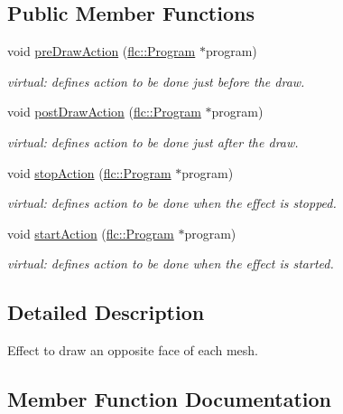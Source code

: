 \subsection*{Public Member Functions}
\begin{DoxyCompactItemize}
\item 
void \hyperlink{classflw_1_1flf_1_1ClockwiseDrawEffect_ab6a8333c2a80dbc56190b73f3d06264e}{pre\+Draw\+Action} (\hyperlink{classflw_1_1flc_1_1Program}{flc\+::\+Program} $\ast$program)
\begin{DoxyCompactList}\small\item\em virtual\+: defines action to be done just before the draw. \end{DoxyCompactList}\item 
void \hyperlink{classflw_1_1flf_1_1ClockwiseDrawEffect_a7ca5b12de498014fd1b7320fbe749e4e}{post\+Draw\+Action} (\hyperlink{classflw_1_1flc_1_1Program}{flc\+::\+Program} $\ast$program)
\begin{DoxyCompactList}\small\item\em virtual\+: defines action to be done just after the draw. \end{DoxyCompactList}\item 
void \hyperlink{classflw_1_1flf_1_1ClockwiseDrawEffect_a538235e072e91bfa16e185a535547679}{stop\+Action} (\hyperlink{classflw_1_1flc_1_1Program}{flc\+::\+Program} $\ast$program)
\begin{DoxyCompactList}\small\item\em virtual\+: defines action to be done when the effect is stopped. \end{DoxyCompactList}\item 
void \hyperlink{classflw_1_1flf_1_1ClockwiseDrawEffect_a5d6c2f7e723f845f615572721f79a5a8}{start\+Action} (\hyperlink{classflw_1_1flc_1_1Program}{flc\+::\+Program} $\ast$program)
\begin{DoxyCompactList}\small\item\em virtual\+: defines action to be done when the effect is started. \end{DoxyCompactList}\end{DoxyCompactItemize}


\subsection{Detailed Description}
Effect to draw an opposite face of each mesh. 

\subsection{Member Function Documentation}
\mbox{\label{classflw_1_1flf_1_1ClockwiseDrawEffect_a7ca5b12de498014fd1b7320fbe749e4e}} 
